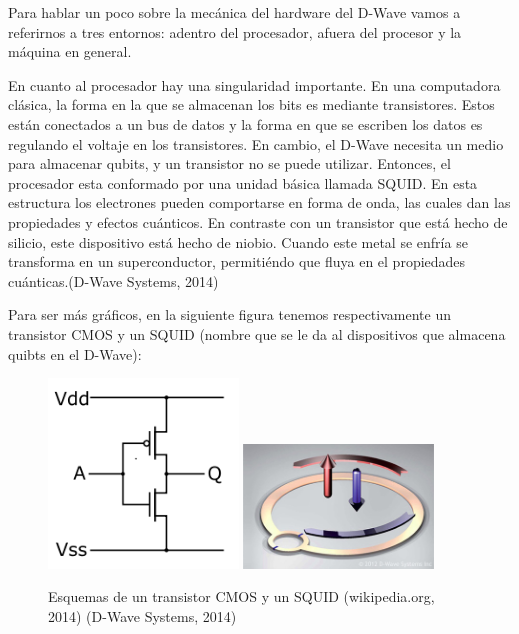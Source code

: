 \documentclass[11pt,a4paper]{article}
\begin{document}
Para hablar un poco sobre la mecánica del hardware del D-Wave vamos a referirnos a tres entornos: adentro del procesador, afuera del procesor y la máquina en general.

En cuanto al procesador hay una singularidad importante. En una computadora clásica, la forma en la que se almacenan los bits es mediante transistores. Estos están conectados a un bus de datos y la forma en que se escriben los datos es regulando el voltaje en los transistores. En cambio, el D-Wave necesita un medio para almacenar qubits, y un transistor no se puede utilizar. Entonces, el procesador esta conformado por una unidad básica llamada SQUID. En esta estructura los electrones pueden comportarse en forma de onda, las cuales dan las propiedades y efectos cuánticos. En contraste con un transistor que está hecho de silicio, este dispositivo está hecho de niobio. Cuando este metal se enfría se transforma en un superconductor, permitiéndo que fluya en el propiedades cuánticas.(D-Wave Systems, 2014)

Para ser más gráficos, en la siguiente figura tenemos respectivamente un transistor CMOS y un SQUID (nombre que se le da al dispositivos que almacena quibts en el D-Wave):

\begin{figure}[h]
\centering
\includegraphics[width=0.45\textwidth]{cmos}
\includegraphics[width=0.45\textwidth]{squid}
\caption{Esquemas de un transistor CMOS y un SQUID (wikipedia.org, 2014) (D-Wave Systems, 2014)}
\end{figure}
\end{document}
